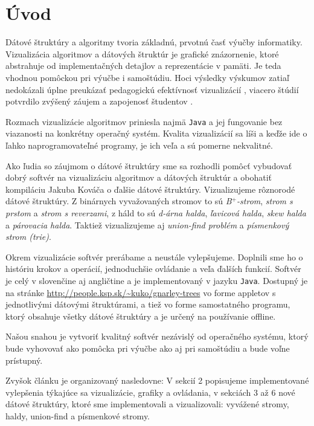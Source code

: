 \section{Úvod}
Dátové štruktúry a algoritmy tvoria základnú, prvotnú časť výučby 
informatiky. Vizualizácia algoritmov a dátových štruktúr je grafické 
znázornenie, ktoré abstrahuje od implementačných detajlov a reprezentácie
v pamäti. Je teda vhodnou pomôckou pri výučbe i samoštúdiu. Hoci výsledky
výskumov zatiaľ nedokázali úplne preukázať pedagogickú efektívnosť
vizualizácií \citep{shaffer}, viacero štúdií potvrdilo zvýšený záujem
a zapojenosť študentov \citep{naps02, hundhausen02}.


Rozmach vizualizácie algoritmov priniesla najmä {\tt Java} a jej fungovanie 
bez viazanosti na konkrétny operačný systém. Kvalita vizualizácií sa líši 
a keďže ide o ľahko naprogramovateľné programy, je ich veľa a sú pomerne 
nekvalitné. 

Ako ľudia so záujmom o dátové štruktúry sme sa rozhodli pomôcť vybudovať 
dobrý softvér na vizualizáciu algoritmov a dátových štruktúr a obohatiť 
kompiláciu Jakuba Kováča \citep{kuko} o ďalšie dátové štruktúry. 
Vizualizujeme rôznorodé dátové štruktúry. Z binárnych vyvažovaných stromov 
to sú \emph{B$^+$-strom}, \emph{strom s prstom} a \emph{strom s reverzami}, z háld to sú \emph{d-árna 
halda}, \emph{ľavicová halda}, \emph{skew halda} a \emph{párovacia halda}. 
Taktiež vizualizujeme aj \emph{union-find problém} a 
\emph{písmenkový strom (trie)}. 

Okrem vizualizácie softvér prerábame a neustále vylepšujeme.
Doplnili sme ho o históriu krokov a operácií, jednoduchšie ovládanie
a veľa ďalších funkcií. Softvér je celý v slovenčine aj angličtine a je 
implementovaný v jazyku \texttt{Java}. Dostupný je na stránke
\hbox{\url{http://people.ksp.sk/~kuko/gnarley-trees}} vo forme appletov
s jednotlivými dátovými štruktúrami, a tiež vo forme samostatného programu,
ktorý obsahuje všetky dátové štruktúry a je určený na používanie offline.

Našou snahou je vytvoriť kvalitný softvér nezávislý od operačného systému, 
ktorý bude vyhovovať ako pomôcka pri výučbe ako aj pri samoštúdiu a bude
voľne prístupný. 

Zvyšok článku je organizovaný nasledovne: V sekcií 2 popisujeme implementované
vylepšenia týkajúce sa vizualizácie, grafiky a ovládania, v sekciách 3 až 6
nové dátové štruktúry, ktoré sme implementovali a vizualizovali: vyvážené
stromy, haldy, union-find a písmenkové stromy.
